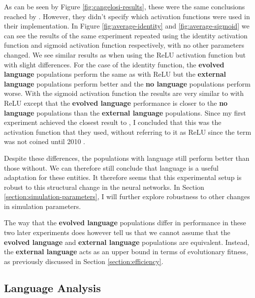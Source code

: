 \documentclass[12pt,a4paper]{report}
\begin{document}
As can be seen by Figure \ref{fig:cangelosi-results}, these were the same conclusions reached by \citet{Cangelosi1998}. However, they didn't specify which activation functions were used in their implementation. In Figure \ref{fig:average-identity} and \ref{fig:average-sigmoid} we can see the results of the same experiment repeated using the identity activation function and sigmoid activation function respectively, with no other parameters changed. We see similar results as when using the ReLU activation function but with slight differences. For the case of the identity function, the {\bf evolved language} populations perform the same as with ReLU but the {\bf external language} populations perform better and the {\bf no language} populations perform worse. With the sigmoid activation function the results are very similar to with ReLU except that the {\bf evolved language} performance is closer to the {\bf no language} populations than the {\bf external language} populations. Since my first experiment achieved the closest result to \citet{Cangelosi1998}, I concluded that this was the activation function that they used, without referring to it as ReLU since the term was not coined until 2010 \citep{nair2010rectified}.

Despite these differences, the populations with language still perform better than those without. We can therefore still conclude that language is a useful adaptation for these entities. It therefore seems that this experimental setup is robust to this structural change in the neural networks. In Section \ref{section:simulation-parameters}, I will further explore robustness to other changes in simulation parameters. 

The way that the {\bf evolved language} populations differ in performance in these two later experiments does however tell us that we cannot assume that the {\bf evolved language} and {\bf external language} populations are equivalent. Instead, the {\bf external language} acts as an upper bound in terms of evolutionary fitness, as previously discussed in Section \ref{section:efficiency}. %


\subsection{Language Analysis}\label{section:languageanalysis}
\end{document}
